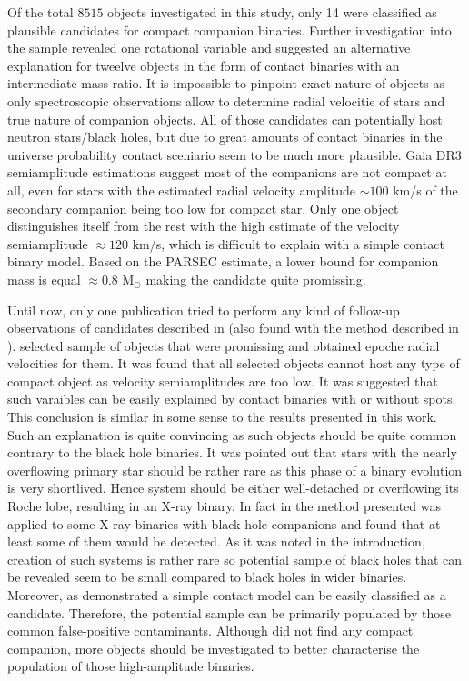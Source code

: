 \documentclass{pracalicmgr}
\begin{document}
Of the total $8515$ objects investigated in this study, only 14 were classified as plausible candidates for compact companion binaries.
Further investigation into the sample revealed one rotational variable and suggested an alternative explanation for tweelve objects in the form of
contact binaries with an intermediate mass ratio. It is impossible to pinpoint exact nature of objects as only spectroscopic observations allow to determine 
radial velocitie of stars and true nature of companion objects. All of those candidates can potentially host neutron stars/black holes, but
due to great amounts of contact binaries in the universe probability contact sceniario seem to be much more plausible.
Gaia DR3 semiamplitude estimations suggest most of the companions are not compact at all, even for stars with the estimated radial velocity amplitude $\sim100$ km/s of the secondary companion being too low for compact star. 
Only one object distinguishes itself from the rest with the high estimate of the velocity semiamplitude $\approx120$ km/s, which is difficult to explain with a simple contact binary model. 
Based on the PARSEC estimate, a lower bound for companion mass is equal $\approx0.8$ M$_{\odot}$ making the candidate quite promissing. 

Until now, only one publication tried to perform any kind of follow-up observations of candidates described in \citet{gomel_gaia_2022} (also 
found with the method described in \citet{gomel_search_2021-2}). \citet{nagarajan_spectroscopic_2023} selected sample of objects that were promissing
and obtained epoche radial velocities for them. It was found that all selected objects cannot host any type of compact object as velocity semiamplitudes are too low.
It was suggested that such varaibles can be easily explained by contact binaries with or without spots. This conclusion is similar in some sense to the results presented in this work.
Such an explanation is quite convincing as such objects should be quite common contrary to the black hole binaries. It was pointed out that stars with the nearly overflowing
primary star should be rather rare as this phase of a binary evolution is very shortlived. Hence system should be either well-detached or overflowing its Roche lobe,
resulting in an X-ray binary.  In fact in \citet{gomel_search_2021-2} the method presented was applied to some X-ray binaries with black hole companions and
found that at least some of them would be detected.
As it was noted in the introduction, creation of such systems is rather rare so potential sample of black holes that can be revealed seem
to be small compared to black holes in wider binaries.
Moreover, as demonstrated a simple contact model can be easily classified as a candidate. 
Therefore, the potential sample can be primarily populated by those common false-positive contaminants.
Although \citet{nagarajan_spectroscopic_2023} did not find any compact companion,
more objects should be investigated to better characterise the population of those high-amplitude binaries.
\end{document}
